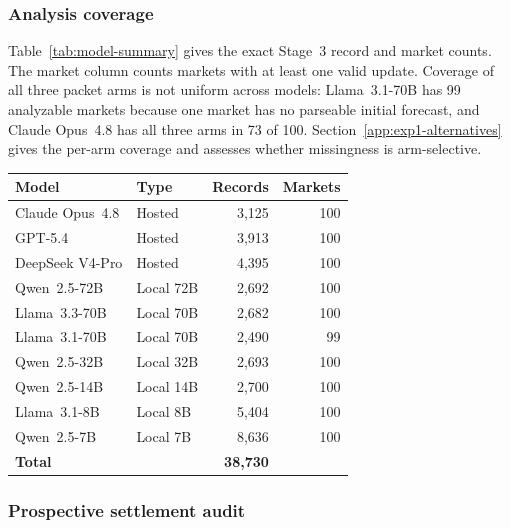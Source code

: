\subsubsection{Analysis coverage}
Table~\ref{tab:model-summary} gives the exact Stage~3 record and market counts.
The market column counts markets with at least one valid update. Coverage of all
three packet arms is not uniform across models: Llama~3.1-70B has 99 analyzable
markets because one market has no parseable initial forecast, and Claude Opus~4.8
has all three arms in 73 of 100. Section~\ref{app:exp1-alternatives} gives the
per-arm coverage and assesses whether missingness is arm-selective.

\begin{center}
\begin{minipage}{\linewidth}
\centering
{}
\label{tab:model-summary}
\small
\begin{tabular}{llrr}
\toprule
\textbf{Model} & \textbf{Type} & \textbf{Records} & \textbf{Markets} \\
\midrule
Claude Opus~4.8 & Hosted  & 3{,}125 & 100 \\
GPT-5.4         & Hosted  & 3{,}913 & 100 \\
DeepSeek V4-Pro & Hosted  & 4{,}395 & 100 \\
Qwen~2.5-72B    & Local 72B & 2{,}692 & 100 \\
Llama~3.3-70B   & Local 70B & 2{,}682 & 100 \\
Llama~3.1-70B   & Local 70B & 2{,}490 &  99 \\
Qwen~2.5-32B    & Local 32B & 2{,}693 & 100 \\
Qwen~2.5-14B    & Local 14B & 2{,}700 & 100 \\
Llama~3.1-8B    & Local 8B  & 5{,}404 & 100 \\
Qwen~2.5-7B     & Local 7B  & 8{,}636 & 100 \\
\midrule
\textbf{Total}  &           & \textbf{38{,}730} & \\
\bottomrule
\end{tabular}
\end{minipage}
\end{center}

\subsubsection{Prospective settlement audit}
\label{app:exp1-outcome-followup}

